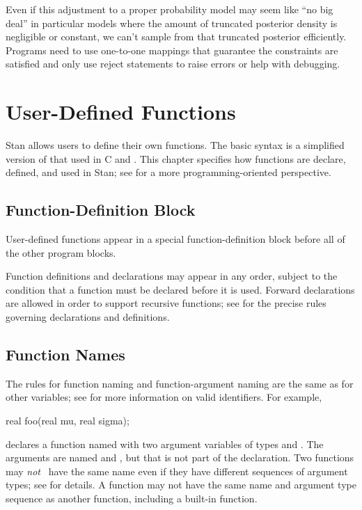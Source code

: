 Even if this adjustment to a proper probability model may seem like
``no big deal'' in particular models where the amount of truncated
posterior density is negligible or constant, we can't sample from that
truncated posterior efficiently.  Programs need to use one-to-one
mappings that guarantee the constraints are satisfied and only use
reject statements to raise errors or help with debugging.

\chapter{User-Defined Functions}\label{functions.chapter}%
%
\noindent
Stan allows users to define their own functions.  The basic syntax is
a simplified version of that used in C and \Cpp.  This chapter
specifies how functions are declare, defined, and used in Stan; see
 for a more programming-oriented
perspective.

\section{Function-Definition Block}

User-defined functions appear in a special function-definition block
before all of the other program blocks.
%
\begin{stancode}
functions {
   // ... function declarations and definitions ...
}
data {
  // ...
\end{stancode}
%
Function definitions and declarations may appear in any order, subject
to the condition that a function must be declared before it is used.
Forward declarations are allowed in order to support recursive
functions; see  for the precise rules
governing declarations and definitions.

\section{Function Names}

The rules for function naming and function-argument naming are the
same as for other variables; see  for more
information on valid identifiers.  For example,
%
\begin{stancode}
real foo(real mu, real sigma);
\end{stancode}
%
declares a function named  with two argument variables of
types  and .  The arguments are named 
and , but that is not part of the declaration.  Two
functions may \emph{not} \, have the same name even if they have
different sequences of argument types; see
 for details.  A function may not
have the same name and argument type sequence as another function,
including a built-in function.

